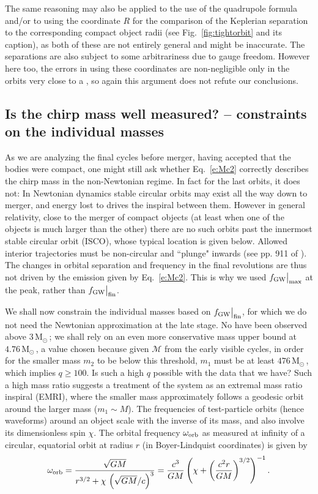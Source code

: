 \documentclass{andp2012}%
\def\w{\omega}
\def\({\left(}
\def\){\right)}
\def\be{\begin{equation}}
\def\ee{\end{equation}}
\newcommand{\inlinecite}[1]{\cite{#1}}
\newcommand{\refigure}[1]{Fig.~\ref{#1}}
\newcommand{\refeqn}[1]{Eq.\ \ref{#1}}
\newcommand{\caveatformat}[1]{\subsection{#1}}
\def\Mc{\mathcal{M}}
\def\submax{\big|_{\rm max}}
\def\fgwmax{f_{\rm GW} \submax}
\def\subfin{\big|_{\rm fin}}
\def\fgwfin{f_{\rm GW} \subfin}
\def\orb{_{\rm orb}}
\newcommand{\Msun}{\ensuremath{\mathrm{M}_\odot\,}}
\begin{document}
The same reasoning may also be applied
to the use of the quadrupole formula\cite{Flanagan:2005yc}
and/or to using the coordinate $R$ for the comparison of
the Keplerian separation to the corresponding compact object radii
(see \refigure{fig:tightorbit} and its caption),
as both of these are not entirely general and might be inaccurate.
The separations are also subject to some arbitrariness due to gauge freedom.
However here too, the errors in using these coordinates are non-negligible
only in the orbits very close to a \BHns,
so again this argument does not refute our conclusions.

\caveatformat{Is the chirp mass well measured? -- constraints on the individual masses}
\label{Sec:just:chirpmass}
As we are analyzing the final cycles before merger,
having accepted that the bodies were compact,
one might still ask whether
\refeqn{e:Mc2} correctly describes the chirp mass
in the non-Newtonian regime\cite{McWilliams:2010eq}.
In fact for the last orbits, it does not:
In Newtonian dynamics
stable circular orbits may exist
all the way down to merger,
and energy lost to \GWs drives
the inspiral between them.
However in general relativity,
close to the merger of compact objects
(at least when one of the objects is much larger than the other)
there are no such orbits past the
innermost stable circular orbit (ISCO),
whose typical location is given below.
Allowed interior trajectories must be non-circular
and ``plunge" inwards (see pp. 911 of \inlinecite{MTW}).
The changes in orbital separation and frequency
in the final revolutions
are thus not driven by the \GW emission
given by \refeqn{e:Mc2}.
This is why we used $\fgwmax$ at the peak,
rather than $\fgwfin$.

We shall now constrain the individual masses based on $\fgwfin$,
for which we do not need the Newtonian approximation at the late stage.
No \NSs have been observed above $3\,\Msun \!$;
we shall rely on an even more conservative \NS mass upper bound
at $4.76\,\Msun\!$, a value chosen because
given $\Mc$ from the early visible cycles, in order for
the smaller mass $m_2$ to be below this threshold, $m_1$ must be at
least $476\,\Msun\!$, which implies $q \geq 100$.
Is such a high $q$ possible with the data that we have?
Such a high mass ratio suggests a treatment of the system as
an extremal mass ratio inspiral (EMRI), where the smaller mass approximately
follows a geodesic orbit around the larger mass ($m_1\sim M$).
The frequencies of test-particle orbits (hence waveforms) around an object scale with
the inverse of its mass, and also involve its dimensionless spin $\chi$.
The orbital frequency $\w\orb$ as measured at infinity of a circular,
equatorial orbit at radius $r$ (in Boyer-Lindquist coordinates)
is given by \cite{Bardeen:1972fi}
%
\be
\label{eq:ModKep}
\w\orb = \frac{\sqrt{G M}}{r^{3/2}+\chi \, \( \sqrt{G M} / c\)^{3}}
%
%
= \frac{c^{3}}{G M}\left( \chi + \(\frac{c^2 r}{GM}\)^{3/2} \right)^{-1} %
.
\ee
%
\end{document}
